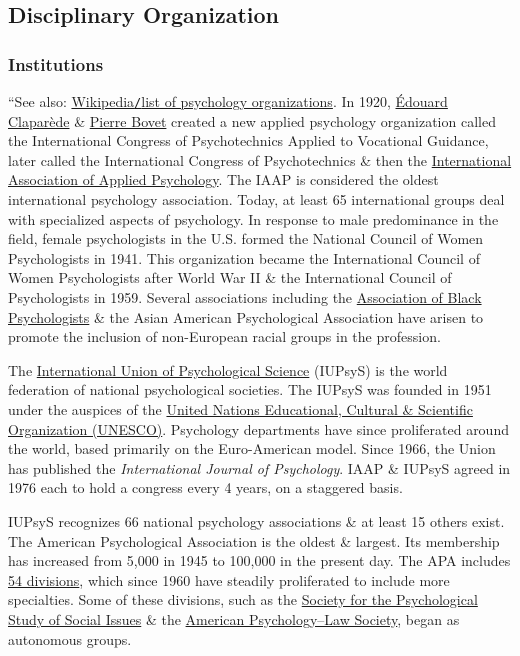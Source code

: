 \documentclass[oneside]{book}
\numberwithin{equation}{section}
\begin{document}
\subsection{Disciplinary Organization}

\subsubsection{Institutions}
``See also: \href{https://en.wikipedia.org/wiki/List_of_psychology_organizations}{Wikipedia\texttt{/}list of psychology organizations}. In 1920, \href{https://en.wikipedia.org/wiki/%C3%89douard_Clapar%C3%A8de}{\'Edouard Clapar\`ede} \& \href{https://en.wikipedia.org/wiki/Pierre_Bovet}{Pierre Bovet} created a new applied psychology organization called the International Congress of Psychotechnics Applied to Vocational Guidance, later called the International Congress of Psychotechnics \& then the \href{https://en.wikipedia.org/wiki/International_Association_of_Applied_Psychology}{International Association of Applied Psychology}. The IAAP is considered the oldest international psychology association. Today, at least 65 international groups deal with specialized aspects of psychology. In response to male predominance in the field, female psychologists in the U.S. formed the National Council of Women Psychologists in 1941. This organization became the International Council of Women Psychologists after World War II \& the International Council of Psychologists in 1959. Several associations including the \href{https://en.wikipedia.org/wiki/Association_of_Black_Psychologists}{Association of Black Psychologists} \& the Asian American Psychological Association have arisen to promote the inclusion of non-European racial groups in the profession.

The \href{https://en.wikipedia.org/wiki/International_Union_of_Psychological_Science}{International Union of Psychological Science} (IUPsyS) is the world federation of national psychological societies. The IUPsyS was founded in 1951 under the auspices of the \href{https://en.wikipedia.org/wiki/UNESCO}{United Nations Educational, Cultural \& Scientific Organization (UNESCO)}. Psychology departments have since proliferated around the world, based primarily on the Euro-American model. Since 1966, the Union has published the \textit{International Journal of Psychology}. IAAP \& IUPsyS agreed in 1976 each to hold a congress every 4 years, on a staggered basis.

IUPsyS recognizes 66 national psychology associations \& at least 15 others exist. The American Psychological Association is the oldest \& largest. Its membership has increased from 5,000 in 1945 to 100,000 in the present day. The APA includes \href{https://en.wikipedia.org/wiki/Divisions_of_the_American_Psychological_Association}{54 divisions}, which since 1960 have steadily proliferated to include more specialties. Some of these divisions, such as the \href{https://en.wikipedia.org/wiki/Society_for_the_Psychological_Study_of_Social_Issues}{Society for the Psychological Study of Social Issues} \& the \href{https://en.wikipedia.org/wiki/American_Psychology%E2%80%93Law_Society}{American Psychology--Law Society}, began as autonomous groups.
\end{document}
